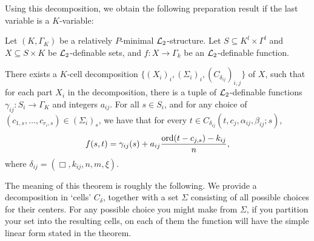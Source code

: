 Using this decomposition, we obtain the following preparation result if the last variable is a $K$-variable:
\begin{thm}\label{thm:partialprep} 
Let $(K,\Gamma_K)$ be a relatively $P$-minimal $\mathcal{L}_2$-structure. Let $S\subseteq K^l\times\Gamma^l$ and $X \subseteq S \times K$ be $\mathcal{L}_2$-definable sets, and $f:X\rightarrow \Gamma_k$ be an $\mathcal{L}_2$-definable function. \item There exists a $K$-cell decomposition $\{(X_i)_{i},(\Sigma_i)_{i}, (C_{\delta_{ij}})_{i,j}\}$ of $X$, such that for each part $X_i$ in the decomposition, there is a tuple of $\mathcal{L}_2$-definable functions $\gamma_{ij}:S_i\to\Gamma_K$ and integers $a_{ij}$. For all $s\in S_i$, and for any choice of  $(c_{1,s}, \ldots, c_{r_i,s}) \in (\Sigma_i)_s$, we have that for every $t \in C_{\delta_{ij}}(t,c_j,\alpha_{ij},\beta_{ij};s)$, 
\[f(s,t) = \gamma_{ij}(s) + a_{ij}\frac{\operatorname{ord}(t-c_{j,s})-k_{ij}}{n},\]
where $\delta_{ij} =(\Box, k_{ij},n,m,\xi)$.
\end{thm}
The meaning of this theorem is roughly the following. 
We provide a decomposition in `cells' $C_{\delta}$, together with a set $\Sigma$ consisting of all possible choices for their centers. 
For any possible choice you might make from $\Sigma$, if you partition your set into the resulting cells, on each of them the function will have the simple linear form stated in the theorem.

